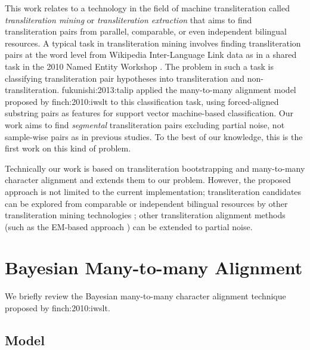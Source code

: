 \documentclass[english]{jnlp_1.4}
\newcommand{\newcite}{}
\begin{document}
This work relates to a technology in the field of machine transliteration called
{\em transliteration mining} or {\em transliteration extraction}
that aims to find transliteration pairs from parallel, comparable, or even independent bilingual resources.
A typical task in transliteration mining involves finding transliteration pairs at the word level
from Wikipedia Inter-Language Link data as in a shared task in the 2010 Named Entity Workshop \cite{kumaran:2010:news}.
The problem in such a task is classifying transliteration pair hypotheses into transliteration and non-transliteration.
\newcite{fukunishi:2013:talip} applied the many-to-many alignment model proposed by \newcite{finch:2010:iwslt} to this classification task,
using forced-aligned substring pairs as features for support vector machine-based classification.
Our work aims to find {\em segmental} transliteration pairs excluding partial noise,
not sample-wise pairs as in previous studies.
To the best of our knowledge, this is the first work on this kind of problem.

Technically our work is based on transliteration bootstrapping \cite{sajjad:2012:acl}
and many-to-many character alignment \cite{finch:2010:iwslt} and extends them to our problem.
\mbox{However,} the proposed approach is not limited to the current implementation;
transliteration candidates can be explored from comparable or independent bilingual resources
by other transliteration mining technologies \cite{al-onaizan:2002:acl,lam:2004:sigir};
other transliteration alignment methods (such as the EM-based approach \cite{kubo:2011:apsipa})
can be extended to partial noise.


\section{Bayesian Many-to-many Alignment}

We briefly review the Bayesian many-to-many character alignment technique proposed by \newcite{finch:2010:iwslt}.


\subsection{Model}
\end{document}
